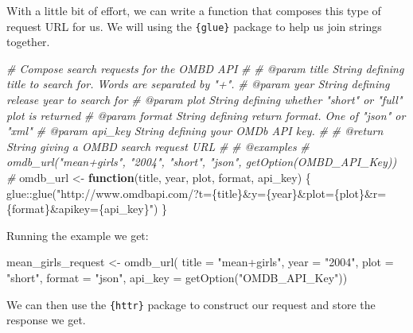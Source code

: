 \documentclass[
  12pt,
]{book}
\newenvironment{Shaded}{\begin{snugshade}}{\end{snugshade}}
\newcommand{\AttributeTok}[1]{\textcolor[rgb]{0.77,0.63,0.00}{#1}}
\newcommand{\CommentTok}[1]{\textcolor[rgb]{0.56,0.35,0.01}{\textit{#1}}}
\newcommand{\ControlFlowTok}[1]{\textcolor[rgb]{0.13,0.29,0.53}{\textbf{#1}}}
\newcommand{\FunctionTok}[1]{\textcolor[rgb]{0.00,0.00,0.00}{#1}}
\newcommand{\NormalTok}[1]{#1}
\newcommand{\OtherTok}[1]{\textcolor[rgb]{0.56,0.35,0.01}{#1}}
\newcommand{\SpecialCharTok}[1]{\textcolor[rgb]{0.00,0.00,0.00}{#1}}
\newcommand{\StringTok}[1]{\textcolor[rgb]{0.31,0.60,0.02}{#1}}
\begin{document}
With a little bit of effort, we can write a function that composes this type of request URL for us. We will using the \texttt{\{glue\}} package to help us join strings together.

\begin{Shaded}
\begin{Highlighting}[]

\CommentTok{\#\textquotesingle{} Compose search requests for the OMBD API}
\CommentTok{\#\textquotesingle{}}
\CommentTok{\#\textquotesingle{} @param title String defining title to search for. Words are separated by "+".}
\CommentTok{\#\textquotesingle{} @param year String defining release year to search for}
\CommentTok{\#\textquotesingle{} @param plot String defining whether "short" or "full" plot is returned}
\CommentTok{\#\textquotesingle{} @param format String defining return format. One of "json" or "xml"}
\CommentTok{\#\textquotesingle{} @param api\_key String defining your OMDb API key.}
\CommentTok{\#\textquotesingle{}}
\CommentTok{\#\textquotesingle{} @return String giving a OMBD search request URL}
\CommentTok{\#\textquotesingle{}}
\CommentTok{\#\textquotesingle{} @examples }
\CommentTok{\#\textquotesingle{} omdb\_url("mean+girls", "2004", "short", "json", getOption(OMBD\_API\_Key))}
\CommentTok{\#\textquotesingle{} }
\NormalTok{omdb\_url }\OtherTok{\textless{}{-}} \ControlFlowTok{function}\NormalTok{(title, year, plot, format, api\_key) \{}
\NormalTok{  glue}\SpecialCharTok{::}\FunctionTok{glue}\NormalTok{(}\StringTok{"http://www.omdbapi.com/?t=\{title\}\&y=\{year\}\&plot=\{plot\}\&r=\{format\}\&apikey=\{api\_key\}"}\NormalTok{)}
\NormalTok{\}}
\end{Highlighting}
\end{Shaded}

Running the example we get:

\begin{Shaded}
\begin{Highlighting}[]
\NormalTok{mean\_girls\_request }\OtherTok{\textless{}{-}} \FunctionTok{omdb\_url}\NormalTok{(}
  \AttributeTok{title =} \StringTok{"mean+girls"}\NormalTok{,}
  \AttributeTok{year =}  \StringTok{"2004"}\NormalTok{,}
  \AttributeTok{plot =} \StringTok{"short"}\NormalTok{,}
  \AttributeTok{format =}  \StringTok{"json"}\NormalTok{,}
  \AttributeTok{api\_key =}  \FunctionTok{getOption}\NormalTok{(}\StringTok{"OMDB\_API\_Key"}\NormalTok{))}
\end{Highlighting}
\end{Shaded}

We can then use the \texttt{\{httr\}} package to construct our request and store the response we get.
\end{document}
